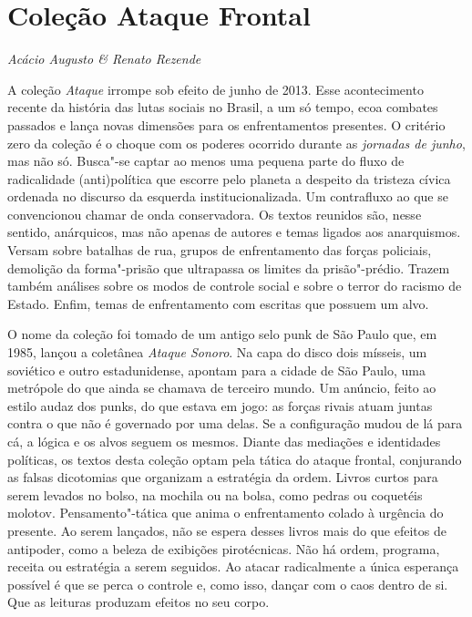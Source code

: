\chapter{Coleção Ataque Frontal}

\begin{flushright}
\emph{Acácio Augusto \& Renato Rezende}
\end{flushright}

\medskip

\noindent{}A coleção \emph{Ataque} irrompe sob efeito de junho de 2013.
Esse acontecimento recente da história das lutas sociais no Brasil, a um só
tempo, ecoa combates passados e lança novas dimensões para os
enfrentamentos presentes. O critério zero da coleção é o choque com os
poderes ocorrido durante as \emph{jornadas de
junho}, mas não só. Busca"-se captar ao menos uma pequena parte do fluxo de
radicalidade (anti)política que escorre pelo planeta a despeito da
tristeza cívica ordenada no discurso da esquerda institucionalizada. Um
contrafluxo ao que se convencionou chamar de onda conservadora. Os
textos reunidos são, nesse sentido,
anárquicos, mas não apenas de autores e temas ligados aos
anarquismos. Versam sobre batalhas de
rua, grupos de enfrentamento das forças policiais, demolição da forma"-prisão que
ultrapassa os limites da prisão"-prédio. Trazem também análises sobre os
modos de controle social e sobre o terror do racismo de Estado. Enfim, temas de enfrentamento com
escritas que possuem um alvo. 

O nome da coleção foi tomado de um antigo
selo punk de São Paulo que, em 1985, lançou a coletânea \emph{Ataque
Sonoro}. Na capa do disco dois mísseis, um soviético e outro
estadunidense, apontam para a cidade de São Paulo, uma metrópole do que
ainda se chamava de terceiro mundo. Um anúncio, feito ao estilo audaz
dos punks, do que estava em jogo: as forças rivais atuam juntas contra o
que não é governado por uma delas. Se a configuração mudou de lá para
cá, a lógica e os alvos seguem os mesmos. Diante das mediações e
identidades políticas, os textos desta coleção optam pela tática do
ataque frontal, conjurando as falsas dicotomias que organizam a
estratégia da ordem. Livros curtos para serem levados no bolso, na
mochila ou na bolsa, como pedras ou coquetéis molotov.
Pensamento"-tática que anima o enfrentamento colado à urgência do
presente. Ao serem lançados, não se espera desses livros mais do que
efeitos de antipoder, como a beleza de exibições pirotécnicas. Não há
ordem, programa, receita ou estratégia a serem seguidos. Ao atacar
radicalmente a única esperança possível é que se perca o controle e,
como isso, dançar com o caos dentro de si. Que as leituras produzam
efeitos no seu corpo.

